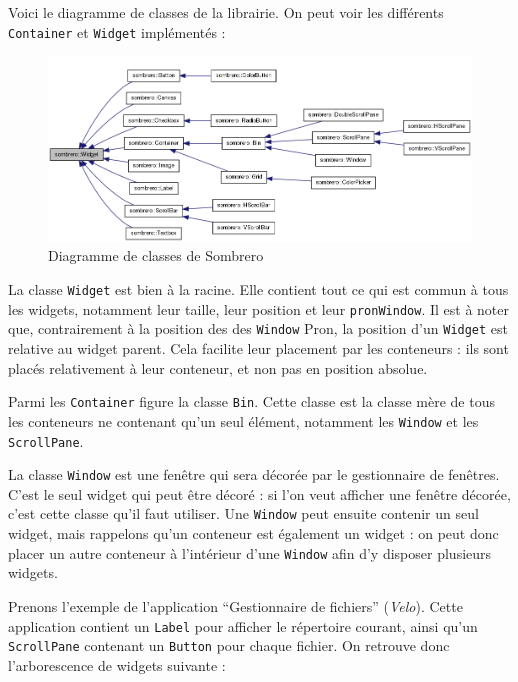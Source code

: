 Voici le diagramme de classes de la librairie. On peut voir les différents \verb|Container| et \verb|Widget| implémentés :

\begin{figure}[H]
  \centering
  \includegraphics[width=17.5cm]{images/classDiagWidget.png}
  \caption{Diagramme de classes de Sombrero}
  \label{fig:diagrame_classes_sombrero}
\end{figure}

La classe \verb|Widget| est bien à la racine.
Elle contient tout ce qui est commun à tous les widgets, notamment leur taille, leur position et leur \verb|pronWindow|.
Il est à noter que, contrairement à la position des des \verb|Window| Pron, la position d'un \verb|Widget| est relative au widget parent.
Cela facilite leur placement par les conteneurs : ils sont placés relativement à leur conteneur, et non pas en position absolue.

Parmi les \verb|Container| figure la classe \verb|Bin|.
Cette classe est la classe mère de tous les conteneurs ne contenant qu'un seul élément, notamment les \verb|Window| et les \verb|ScrollPane|.

La classe \verb|Window| est une fenêtre qui sera décorée par le gestionnaire de fenêtres.
C'est le seul widget qui peut être décoré : si l'on veut afficher une fenêtre décorée, c'est cette classe qu'il faut utiliser.
Une \verb|Window| peut ensuite contenir un seul widget, mais rappelons qu'un conteneur est également un widget : on peut donc placer un autre conteneur à l'intérieur d'une \verb|Window| afin d'y disposer plusieurs widgets.

Prenons l'exemple de l'application ``Gestionnaire de fichiers'' (\textit{Velo}).
Cette application contient un \verb|Label| pour afficher le répertoire courant, ainsi qu'un \verb|ScrollPane| contenant un \verb|Button| pour chaque fichier. On retrouve donc l'arborescence de widgets suivante :

\begin{center}
\end{center}

